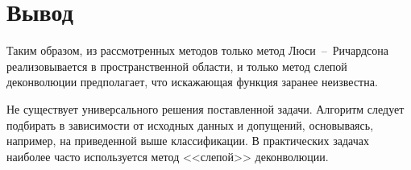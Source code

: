 \clearpage

\section*{Вывод}

Таким образом, из рассмотренных методов только метод Люси~--~Ричардсона реализовывается в пространственной области, и только метод слепой деконволюции предполагает, что искажающая функция заранее неизвестна. 

Не существует универсального решения поставленной задачи. Алгоритм следует подбирать в зависимости от исходных данных и допущений, основываясь, например, на приведенной выше классификации. В практических задачах наиболее часто используется метод <<слепой>> деконволюции.



